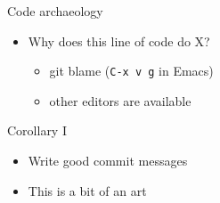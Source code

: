 \documentclass[presentation]{beamer}
\begin{document}
\begin{frame}[fragile,label=sec-1-10]{Code archaeology}
 \begin{itemize}
\item Why does this line of code do X?
\begin{itemize}
\item git blame (\texttt{C-x v g} in Emacs)
\item other editors are available
\end{itemize}
\end{itemize}
\end{frame}
\begin{frame}[label=sec-1-11]{Corollary I}
\begin{itemize}
\item Write good commit messages
\item This is a bit of an art
\end{itemize}
\end{frame}
\end{document}

